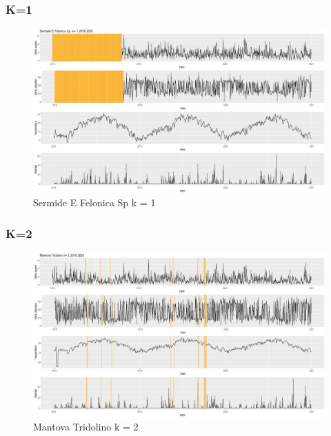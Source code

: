 \documentclass{article}
\begin{document}
\subsubsection{K=1}
\begin{figure}[H]
  \centering 
  \includegraphics[scale = 0.3]{Picture/1/Sermide E Felonica .jpeg}
  \caption{Sermide E Felonica Sp  k = 1}
  \centering
\end{figure}
\subsubsection{K=2}
\begin{figure}[H]
  \centering 
  \includegraphics[scale = 0.3]{Picture/2/Mantova Tridolino k= 2 2018 2020 .jpeg}
  \caption{Mantova Tridolino k = 2}
  \centering
\end{figure}
\end{document}
